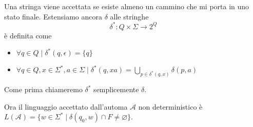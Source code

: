 \documentclass[12pt]{report}
\begin{document}
Una stringa viene accettata se esiste almeno un cammino che mi porta in uno stato finale.
Estensiamo ancora $\delta$ alle stringhe 
$$ \delta^* : Q \times \Sigma \rightarrow 2^Q $$
è definita come
\begin{itemize}
	\item $\forall q \in Q \mid \delta^*(q, \epsilon) = \{ q \} $
	\item $\forall q \in Q, x \in \Sigma^*, a \in \Sigma \mid \delta^*(q, xa) = \bigcup_{p \in \delta^*(q, x)} \delta(p, a) $
\end{itemize}

Come prima chiameremo $\delta^*$ semplicemente $\delta$.

Ora il linguaggio accettato dall'automa $\mathscr{A}$ non deterministico è $L(\mathscr{A}) = \{ w \in \Sigma^* \mid \delta(q_0, w) \cap F \neq \varnothing \}$.
\end{document}
